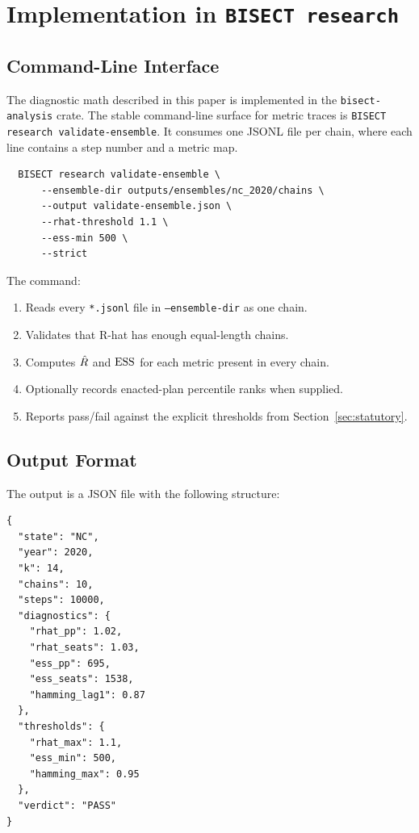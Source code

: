 \section{Implementation in \texttt{BISECT research}}
\label{sec:implementation}

\subsection{Command-Line Interface}

The diagnostic math described in this paper is implemented in the
\texttt{bisect-analysis} crate. The stable command-line surface for metric
traces is \texttt{BISECT research validate-ensemble}. It consumes one JSONL file
per chain, where each line contains a step number and a metric map.

\begin{verbatim}
  BISECT research validate-ensemble \
      --ensemble-dir outputs/ensembles/nc_2020/chains \
      --output validate-ensemble.json \
      --rhat-threshold 1.1 \
      --ess-min 500 \
      --strict
\end{verbatim}

The command:
\begin{enumerate}
\item Reads every \texttt{*.jsonl} file in \texttt{--ensemble-dir} as one chain.
\item Validates that R-hat has enough equal-length chains.
\item Computes $\hat{R}$ and $\mathrm{ESS}$ for each metric present in every chain.
\item Optionally records enacted-plan percentile ranks when supplied.
\item Reports pass/fail against the explicit thresholds from
      Section~\ref{sec:statutory}.
\end{enumerate}

\subsection{Output Format}

The output is a JSON file with the following structure:

\begin{verbatim}
{
  "state": "NC",
  "year": 2020,
  "k": 14,
  "chains": 10,
  "steps": 10000,
  "diagnostics": {
    "rhat_pp": 1.02,
    "rhat_seats": 1.03,
    "ess_pp": 695,
    "ess_seats": 1538,
    "hamming_lag1": 0.87
  },
  "thresholds": {
    "rhat_max": 1.1,
    "ess_min": 500,
    "hamming_max": 0.95
  },
  "verdict": "PASS"
}
\end{verbatim}

